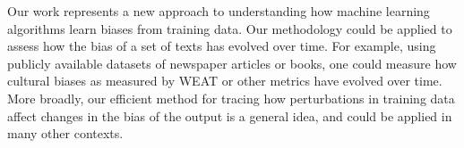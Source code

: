 \documentclass{article}
\begin{document}
Our work represents a new approach to understanding how machine learning algorithms learn biases from training data. 
Our methodology could be applied to assess how the bias of a set of texts has evolved over time. For example, using publicly available datasets of newspaper articles or books, one could measure how cultural biases as measured by WEAT or other metrics have evolved over time. 
More broadly, our efficient method
for tracing how perturbations in training data affect changes in the bias of the output is a general idea, and could be applied in many other contexts.







\end{document}
